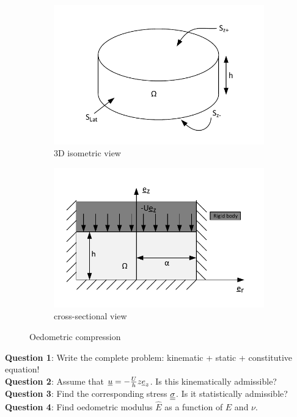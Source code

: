 \documentclass[letter,12pt]{article}
\begin{document}
\begin{figure}[ht]
	\centering
	\begin{subfigure}{.4\textwidth}
		\centering
		\includegraphics[width=1\linewidth]{problem4_isometric}
		\caption{3D isometric view}
	\end{subfigure}
	\hspace{10mm}
	\begin{subfigure}{.45\textwidth}
		\hspace{0.5cm}
		\includegraphics[width=1\linewidth]{problem4_2d}
		\caption{cross-sectional view}
	\end{subfigure}	
	\caption{Oedometric compression}
	\label{fig:problem4}
\end{figure}


\noindent \textbf{Question 1}: Write the complete problem: kinematic + static + constitutive equation! \\

\noindent \textbf{Question 2}: Assume that $\underline{u} = - \frac{U}{h} z \underline{e}_z $. Is this kinematically admissible? \\

\noindent \textbf{Question 3}: Find the corresponding stress $\underline{\underline{\sigma}}$. Is it statistically admissible? \\

\noindent \textbf{Question 4}: Find oedometric  modulus $\hat{E}$ as a  function of $E$ and $\nu$.
\end{document}
